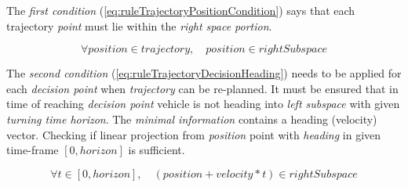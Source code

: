 The \emph{first condition} (\ref{eq:ruleTrajectoryPositionCondition}) says that each trajectory \emph{point} must lie within the \emph{right space portion}. 

\begin{equation}\label{eq:ruleTrajectoryPositionCondition}
    \forall position \in trajectory,\quad position \in rightSubspace
\end{equation}

\noindent The \emph{second condition} (\ref{eq:ruleTrajectoryDecisionHeading}) needs to be applied for each \emph{decision point} when \emph{trajectory} can be re-planned. It must be ensured that in time of reaching \emph{decision point} vehicle is not heading into \emph{left subspace} with given \emph{turning time horizon}. The \emph{minimal information} contains a heading (velocity) vector. Checking if linear projection from \emph{position} point with \emph{heading} in given time-frame $[0,horizon]$ is sufficient.

\begin{equation}\label{eq:ruleTrajectoryDecisionHeading}
    \forall t\in[0,horizon],\quad \left(position + velocity*t\right) \in rightSubspace
\end{equation}

